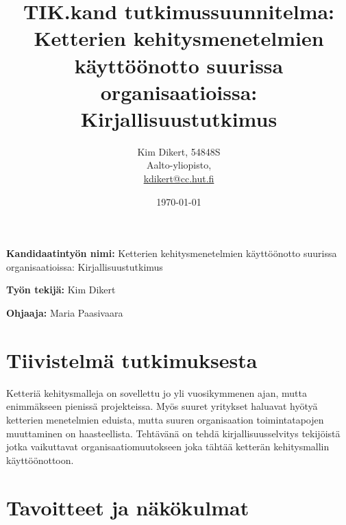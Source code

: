 \documentclass[12pt,a4paper,finnish,oneside]{article}
\begin{document}
\pagestyle{plain}


\title{TIK.kand tutkimussuunnitelma:\\[5mm]
Ketterien kehitysmenetelmien käyttöönotto suurissa organisaatioissa: Kirjallisuustutkimus}

\author{Kim Dikert, 54848S\\
Aalto-yliopisto,\\
\url{kdikert@cc.hut.fi}}

\date{\today}

\maketitle


\vspace{10mm}

%

\textbf{Kandidaatintyön nimi:} Ketterien kehitysmenetelmien käyttöönotto suurissa organisaatioissa: Kirjallisuustutkimus

\textbf{Työn tekijä:} Kim Dikert

\textbf{Ohjaaja:} Maria Paasivaara


\section{Tiivistelmä tutkimuksesta}

Ketteriä kehitysmalleja on sovellettu jo yli vuosikymmenen ajan, mutta
enimmäkseen pienissä projekteissa. Myös suuret yritykset haluavat hyötyä
ketterien menetelmien eduista, mutta suuren organisaation toimintatapojen
muuttaminen on haasteellista. Tehtävänä on tehdä kirjallisuusselvitys tekijöistä
jotka vaikuttavat organisaatiomuutokseen joka tähtää ketterän kehitysmallin
käyttöönottoon.


\section{Tavoitteet ja näkökulmat}
\end{document}
